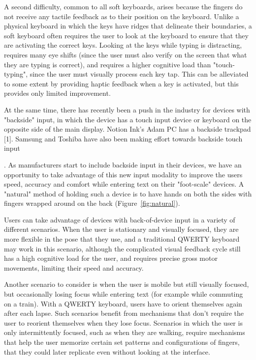 A second difficulty, common to all soft keyboards, arises because the
fingers do not receive any tactile feedback as to their position on
the keyboard.  Unlike a physical keyboard in which the keys have
ridges that delineate their boundaries, a soft keyboard often requires
the user to look at the keyboard to ensure that they are activating
the correct keys.  Looking at the keys while typing is distracting,
requires many eye shifts (since the user must also verify on the
screen that what they are typing is correct), and requires a higher
cognitive load than "touch-typing", since the user must visually
process each key tap.  This can be alleviated to some extent by
providing haptic feedback when a key is activated, but this provides
only limited improvement.

At the same time, there has recently been a push in the industry for
devices with "backside" input, in which the device has a touch input
device or keyboard on the opposite side of the main display. Notion
Ink's Adam PC has a backside trackpad [1]. Samsung and Toshiba have
also been making effort towards backside touch input

. As manufacturers start to include backside input in
their devices, we have an opportunity to take advantage of this new
input modality to improve the users speed, accuracy and comfort while
entering text on their "foot-scale" devices.  A "natural" method of
holding such a device is to have hands on both the sides with fingers
wrapped around on the back (Figure~\ref{fig:natural}).

Users can take advantage of devices with back-of-device input in a variety
of different scenarios. When the user is stationary and visually
focused, they are more flexible in the pose that they use, and a
traditional QWERTY keyboard may work in this scenario, although the
complicated visual feedback cycle still has a high cognitive load for
the user, and requires precise gross motor movements, limiting their speed and accuracy. 

Another scenario to consider is when the user is mobile but still
visually focused, but occasionally losing focus while entering
text (for example while commuting on a train).  With a QWERTY keyboard,
users have to orient themselves again after each lapse. Such scenarios
benefit from mechanisms that don't require the user to reorient
themselves when they lose focus.  Scenarios in which the user is only
intermittently focused, such as when they are walking, require
mechanisms that help the user memorize certain set patterns and
configurations of fingers, that they could later replicate even without looking
at the interface. 


